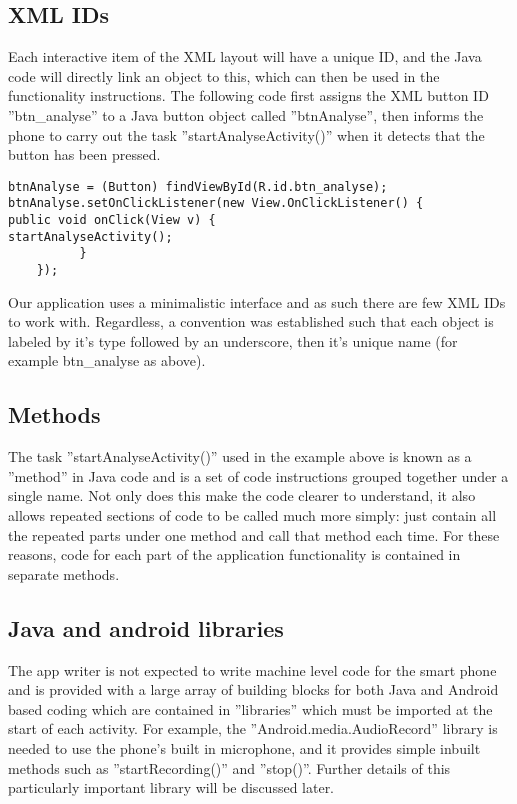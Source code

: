 \subsection{XML IDs}
Each interactive item of the XML layout will have a unique ID, and the Java code will directly link an object to this, which can then be used in the functionality instructions. The following code first assigns the XML button ID ''btn\_analyse'' to a Java button object called ''btnAnalyse'', then informs the phone to carry out the task ''startAnalyseActivity()'' when it detects that the button has been pressed.
\begin{lstlisting}
btnAnalyse = (Button) findViewById(R.id.btn_analyse);
btnAnalyse.setOnClickListener(new View.OnClickListener() {
public void onClick(View v) {
startAnalyseActivity();
          }
    });
\end{lstlisting}
Our application uses a minimalistic interface and as such there are few XML IDs to work with. Regardless, a convention was established such that each object is labeled by it’s type followed by an underscore, then it’s unique name (for example btn\_analyse as above).
\subsection{Methods}
The task ''startAnalyseActivity()'' used in the example above is known as a ''method'' in Java code and is a set of code instructions grouped together under a single name. Not only does this make the code clearer to understand, it also allows repeated sections of code to be called much more simply: just contain all the repeated parts under one method and call that method each time. For these reasons, code for each part of the application functionality is contained in separate methods.
\subsection{Java and android libraries}
The app writer is not expected to write machine level code for the smart phone and is provided with a large array of building blocks for both Java and Android based coding which are contained in ''libraries'' which must be imported at the start of each activity. For example, the ''Android.media.AudioRecord'' library is needed to use the phone’s built in microphone, and it provides simple inbuilt methods such as ''startRecording()'' and ''stop()''. Further details of this particularly important library will be discussed later.
